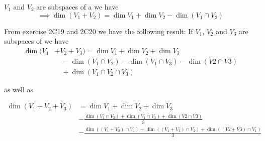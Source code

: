\begin{thm} $V_1$ and $V_2$ are subspaces of a \fdvs we have
  \begin{equation}
    \implies \dim (V_1 + V_2) = \dim V_1 + \dim V_2 - \dim (V_1 \cap V_2)
  \end{equation}

  From exercise 2C19 and 2C20 we have the following result:
  If $V_1$, $V_2$ and $V_3$ are subspaces of \fdvs we have
  \begin{equation}
    \begin{aligned}
      \dim (V_1 &+ V_2 + V_3) = \dim V_1 + \dim V_2 + \dim V_3 \\
      & \quad - \dim (V_1 \cap V_2) - \dim (V_1 \cap V_3) - \dim (V2 \cap V3) \\
      & \quad + \dim (V_1 \cap V_2 \cap V_3)
    \end{aligned}
  \end{equation}

as well as

  \begin{equation}
    \begin{aligned}
      \dim (V_1 + V_2 + V_3)  &= \dim V_1 + \dim V_2 + \dim V_3 \\
       & - \frac{\dim (V_1 \cap V_2) + \dim (V_1 \cap V_3) + \dim (V2 \cap V3)}{3} \\
       &- \frac{ \dim \left(  (V_1 + V_2) \cap V_3 \right) + \dim \left( (V_1 + V_3) \cap V_2 \right)+ \dim \left( (V2 + V3) \cap V_1 \right) }{3} \\
    \end{aligned}
  \end{equation}
\end{thm}

